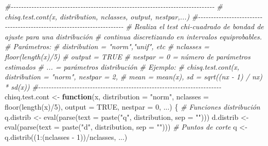 \documentclass[
]{book}
\newenvironment{Shaded}{\begin{snugshade}}{\end{snugshade}}
\newcommand{\AttributeTok}[1]{\textcolor[rgb]{0.77,0.63,0.00}{#1}}
\newcommand{\CommentTok}[1]{\textcolor[rgb]{0.56,0.35,0.01}{\textit{#1}}}
\newcommand{\ConstantTok}[1]{\textcolor[rgb]{0.00,0.00,0.00}{#1}}
\newcommand{\ControlFlowTok}[1]{\textcolor[rgb]{0.13,0.29,0.53}{\textbf{#1}}}
\newcommand{\DecValTok}[1]{\textcolor[rgb]{0.00,0.00,0.81}{#1}}
\newcommand{\FunctionTok}[1]{\textcolor[rgb]{0.00,0.00,0.00}{#1}}
\newcommand{\NormalTok}[1]{#1}
\newcommand{\OtherTok}[1]{\textcolor[rgb]{0.56,0.35,0.01}{#1}}
\newcommand{\SpecialCharTok}[1]{\textcolor[rgb]{0.00,0.00,0.00}{#1}}
\newcommand{\StringTok}[1]{\textcolor[rgb]{0.31,0.60,0.02}{#1}}
\theoremstyle{break}
\theoremstyle{definition}
\theoremstyle{definition}
\theoremstyle{definition}
\theoremstyle{definition}
\theoremstyle{remark}
\begin{document}
\begin{Shaded}
\begin{Highlighting}[]
\CommentTok{\#{-}{-}{-}{-}{-}{-}{-}{-}{-}{-}{-}{-}{-}{-}{-}{-}{-}{-}{-}{-}{-}{-}{-}{-}{-}{-}{-}{-}{-}{-}{-}{-}{-}{-}{-}{-}{-}{-}{-}{-}{-}{-}{-}{-}{-}{-}{-}{-}{-}{-}{-}{-}{-}{-}{-}{-}{-}{-}{-}{-}{-}{-}{-}{-}{-}{-}{-}{-}{-}{-}{-}{-}{-}{-}{-}{-}{-}{-}{-}}
\CommentTok{\# chisq.test.cont(x, distribution, nclasses, output, nestpar,...)}
\CommentTok{\#{-}{-}{-}{-}{-}{-}{-}{-}{-}{-}{-}{-}{-}{-}{-}{-}{-}{-}{-}{-}{-}{-}{-}{-}{-}{-}{-}{-}{-}{-}{-}{-}{-}{-}{-}{-}{-}{-}{-}{-}{-}{-}{-}{-}{-}{-}{-}{-}{-}{-}{-}{-}{-}{-}{-}{-}{-}{-}{-}{-}{-}{-}{-}{-}{-}{-}{-}{-}{-}{-}{-}}
\CommentTok{\# Realiza el test chi{-}cuadrado de bondad de ajuste para una distribución }
\CommentTok{\# continua discretizando en intervalos equiprobables.}
\CommentTok{\# Parámetros:}
\CommentTok{\#   distribution = "norm","unif", etc}
\CommentTok{\#   nclasses = floor(length(x)/5)}
\CommentTok{\#   output = TRUE}
\CommentTok{\#   nestpar = 0 = número de parámetros estimados}
\CommentTok{\#   ... = parámetros distribución}
\CommentTok{\# Ejemplo:}
\CommentTok{\#   chisq.test.cont(x, distribution = "norm", nestpar = 2, }
\CommentTok{\#                   mean = mean(x), sd = sqrt((nx {-} 1) / nx) * sd(x))}
\CommentTok{\#{-}{-}{-}{-}{-}{-}{-}{-}{-}{-}{-}{-}{-}{-}{-}{-}{-}{-}{-}{-}{-}{-}{-}{-}{-}{-}{-}{-}{-}{-}{-}{-}{-}{-}{-}{-}{-}{-}{-}{-}{-}{-}{-}{-}{-}{-}{-}{-}{-}{-}{-}{-}{-}{-}{-}{-}{-}{-}{-}{-}{-}{-}{-}{-}{-}{-}{-}{-}{-}{-}{-}}
\NormalTok{chisq.test.cont }\OtherTok{\textless{}{-}} \ControlFlowTok{function}\NormalTok{(x, }\AttributeTok{distribution =} \StringTok{"norm"}\NormalTok{, }
    \AttributeTok{nclasses =} \FunctionTok{floor}\NormalTok{(}\FunctionTok{length}\NormalTok{(x)}\SpecialCharTok{/}\DecValTok{5}\NormalTok{), }\AttributeTok{output =} \ConstantTok{TRUE}\NormalTok{, }\AttributeTok{nestpar =} \DecValTok{0}\NormalTok{, ...) \{}
    \CommentTok{\# Funciones distribución}
\NormalTok{    q.distrib }\OtherTok{\textless{}{-}} \FunctionTok{eval}\NormalTok{(}\FunctionTok{parse}\NormalTok{(}\AttributeTok{text =} \FunctionTok{paste}\NormalTok{(}\StringTok{"q"}\NormalTok{, distribution, }\AttributeTok{sep =} \StringTok{""}\NormalTok{)))}
\NormalTok{    d.distrib }\OtherTok{\textless{}{-}} \FunctionTok{eval}\NormalTok{(}\FunctionTok{parse}\NormalTok{(}\AttributeTok{text =} \FunctionTok{paste}\NormalTok{(}\StringTok{"d"}\NormalTok{, distribution, }\AttributeTok{sep =} \StringTok{""}\NormalTok{)))}
    \CommentTok{\# Puntos de corte}
\NormalTok{    q }\OtherTok{\textless{}{-}} \FunctionTok{q.distrib}\NormalTok{((}\DecValTok{1}\SpecialCharTok{:}\NormalTok{(nclasses }\SpecialCharTok{{-}} \DecValTok{1}\NormalTok{))}\SpecialCharTok{/}\NormalTok{nclasses, ...)}

\end{Highlighting}
\end{Shaded}
\end{document}
